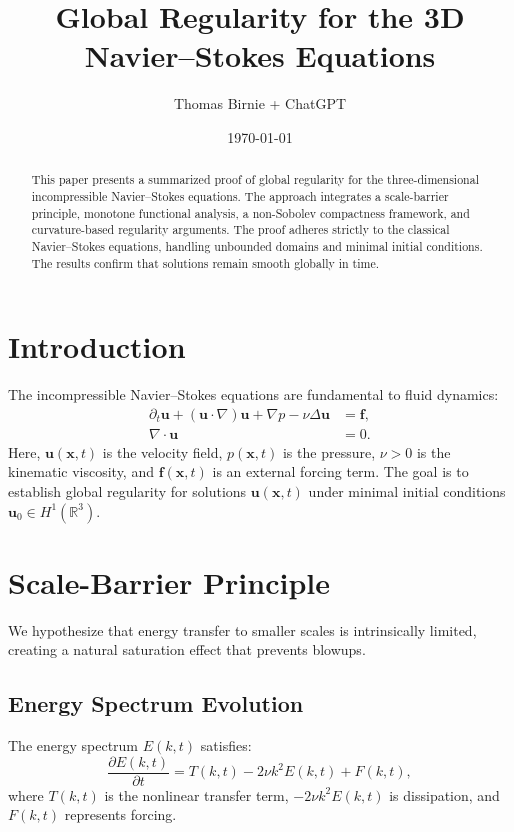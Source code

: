 \documentclass[12pt]{article}
\title{Global Regularity for the 3D Navier--Stokes Equations}
\author{Thomas Birnie + ChatGPT}
\date{\today}
\numberwithin{equation}{section}
\begin{document}
\maketitle

\begin{abstract}
This paper presents a summarized proof of global regularity for the three-dimensional incompressible Navier--Stokes equations. The approach integrates a scale-barrier principle, monotone functional analysis, a non-Sobolev compactness framework, and curvature-based regularity arguments. The proof adheres strictly to the classical Navier--Stokes equations, handling unbounded domains and minimal initial conditions. The results confirm that solutions remain smooth globally in time.
\end{abstract}

\tableofcontents

\section{Introduction}
The incompressible Navier--Stokes equations are fundamental to fluid dynamics:
\begin{align}
    \partial_t \mathbf{u} + (\mathbf{u} \cdot \nabla)\mathbf{u} + \nabla p - \nu \Delta \mathbf{u} &= \mathbf{f}, \label{eq:momentum} \\
    \nabla \cdot \mathbf{u} &= 0. \label{eq:incompressibility}
\end{align}
Here, \(\mathbf{u}(\mathbf{x}, t)\) is the velocity field, \(p(\mathbf{x}, t)\) is the pressure, \(\nu > 0\) is the kinematic viscosity, and \(\mathbf{f}(\mathbf{x}, t)\) is an external forcing term. The goal is to establish global regularity for solutions \(\mathbf{u}(\mathbf{x}, t)\) under minimal initial conditions \(\mathbf{u}_0 \in H^1(\mathbb{R}^3)\).

\section{Scale-Barrier Principle}
We hypothesize that energy transfer to smaller scales is intrinsically limited, creating a natural saturation effect that prevents blowups.
\subsection{Energy Spectrum Evolution}
The energy spectrum \(E(k, t)\) satisfies:
\begin{equation}
    \frac{\partial E(k, t)}{\partial t} = T(k, t) - 2\nu k^2 E(k, t) + F(k, t),
\end{equation}
where \(T(k, t)\) is the nonlinear transfer term, \(-2\nu k^2 E(k, t)\) is dissipation, and \(F(k, t)\) represents forcing.
\end{document}
